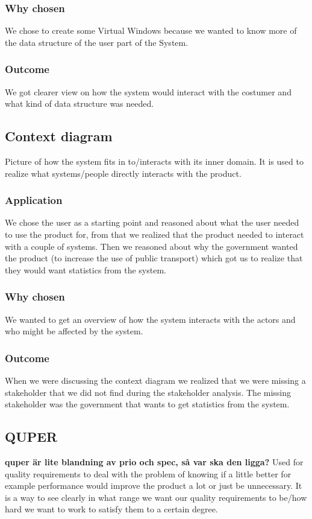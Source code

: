 \documentclass[a4paper]{article}
\begin{document}
			\subsubsection{Why chosen}
				We chose to create some Virtual Windows because we wanted to know more of the data structure of the user part of the System.
			\subsubsection{Outcome}
				We got clearer view on how the system would interact with the costumer and what kind of data structure was needed.
		\subsection{Context diagram} \label{subsec:context}
		Picture of how the system fits in to/interacts with its inner domain. It is used to realize what systems/people directly interacts with the product.
			\subsubsection{Application}
			We chose the user as a starting point and reasoned about what the user needed to use the product for, from that we realized that the product needed to interact with a couple of systems. Then we reasoned about why the government wanted the product (to increase the use of public transport) which got us to realize that they would want statistics from the system.
			\subsubsection{Why chosen}
			We wanted to get an overview of how the system interacts with the actors and who might be affected by the system.
			\subsubsection{Outcome}
			When we were discussing the context diagram we realized that we were missing a stakeholder that we did not find during the stakeholder analysis. The missing stakeholder was the government that wants to get statistics from the system. 

		\subsection{QUPER}
		\textbf{quper är lite blandning av prio och spec, så var ska den ligga?}
		Used for quality requirements to deal with the problem of knowing if a little better for example performance would improve the product a lot or just be unnecessary. It is a way to see clearly in what range we want our quality requirements to be/how hard we want to work to satisfy them to a certain degree.
\end{document}
